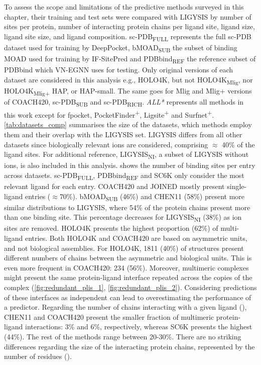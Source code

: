 To assess the scope and limitations of the predictive methods surveyed in this chapter, their training and test sets were compared with LIGYSIS by number of sites per protein, number of interacting protein chains per ligand site, ligand size, ligand site size, and ligand composition. sc-PDB\textsubscript{FULL} represents the full sc-PDB dataset used for training by DeepPocket, bMOAD\textsubscript{SUB} the subset of binding MOAD used for training by IF-SitePred and PDBbind\textsubscript{REF} the reference subset of PDBbind which VN-EGNN uses for testing. Only original versions of each dataset are considered in this analysis e.g., HOLO4K, but not HOLO4K\textsubscript{Mlig}, nor HOLO4K\textsubscript{Mlig+} HAP, or HAP-small. The same goes for Mlig and Mlig+ versions of COACH420, sc-PDB\textsubscript{SUB} and sc-PDB\textsubscript{RICH}. \textit{ALL*} represents all methods in this work except for fpocket, PocketFinder\textsuperscript{+}, Ligsite\textsuperscript{+} and Surfnet\textsuperscript{+}. \autoref{tab:datasets_comp} summarises the size of the datasets, which methods employ them and their overlap with the LIGYSIS set. LIGYSIS differs from all other datasets since biologically relevant ions are considered, comprising $\approx$ 40\% of the ligand sites. For additional reference, LIGYSIS\textsubscript{NI}, a subset of LIGYSIS without ions, is also included in this analysis.  shows the number of binding sites per entry across datasets. sc-PDB\textsubscript{FULL}, PDBbind\textsubscript{REF} and SC6K only consider the most relevant ligand for each entry. COACH420 and JOINED mostly present single-ligand entries ($\approx$70\%). bMOAD\textsubscript{SUB} (46\%) and CHEN11 (58\%) present more similar distributions to LIGYSIS, where 54\% of the protein chains present more than one binding site. This percentage decreases for LIGYSIS\textsubscript{NI} (38\%) as ion sites are removed. HOLO4K presents the highest proportion (62\%) of multi-ligand entries. Both HOLO4K and COACH420 are based on asymmetric units, and not biological assemblies. For HOLO4K, 1811 (40\%) of structures present different numbers of chains between the asymmetric and biological units. This is even more frequent in COACH420: 234 (56\%). Moreover, multimeric complexes might present the same protein-ligand interface repeated across the copies of the complex (\autoref{fig:redundant_plis_1}, \autoref{fig:redundant_plis_2}). Considering predictions of these interfaces as independent can lead to overestimating the performance of a predictor. Regarding the number of chains interacting with a given ligand (), CHEN11 and COACH420 present the smaller fraction of multimeric protein-ligand interactions: 3\% and 6\%, respectively, whereas SC6K presents the highest (44\%). The rest of the methods range between 20-30\%. There are no striking differences regarding the size of the interacting protein chains, represented by the number of residues ().

